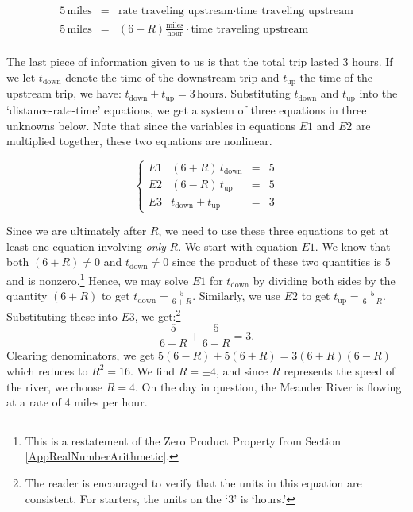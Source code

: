 \documentclass{ximera}
\begin{document}
\begin{example}
\begin{explanation}
\[\begin{array}{rcl}
5 \, \text{miles} & = & \text{rate traveling upstream} \cdot \text{time traveling upstream} \\ 

5 \, \text{miles} & = & (6 - R) \frac{\text{miles}}{\text{hour}} \cdot \text{time traveling upstream} \\ 	\end{array} \]
 
The last piece of information given to us is that the total trip lasted $3$ hours.  If we let $t_{\text{down}}$ denote the time of the downstream trip and $t_{\text{up}}$ the time of the upstream trip, we have:    $t_{\text{down}} + t_{\text{up}} = 3 \, \text{hours}$.  Substituting $t_{\text{down}}$ and $t_{\text{up}}$ into the `distance-rate-time' equations, we get a system of three equations in three unknowns below.  Note that since the variables in equations $E1$ and $E2$ are multiplied together, these two equations are nonlinear.

 \[\left\{\begin{array}{lrcl}   E1 & (6+R) \, t_{\text{down}} & = & 5 \\ E2 & (6-R) \, t_{\text{up}} & = & 5 \\ E3 & t_{\text{down}} + t_{\text{up}} & = & 3 \end{array} \right.\]

Since we are ultimately after $R$, we need to use these three equations to get at least one equation involving \textit{only} $R$.  We start with equation $E1$. We know that both $(6+R) \neq 0$  and  $t_{\text{down}} \neq 0$ since the product of these two quantities is $5$ and is nonzero.\footnote{This is a restatement of the Zero Product Property from Section \ref{AppRealNumberArithmetic}.}  Hence, we may solve $E1$ for $t_{\text{down}}$ by dividing both sides by the quantity $(6+R)$ to get $t_{\text{down}} = \frac{5}{6+R}$.   Similarly, we use $E2$  to get $t_{\text{up}} = \frac{5}{6-R}$. Substituting these into $E3$, we get:\footnote{The reader is encouraged to verify that the units in this equation are consistent. For starters, the units on the `3' is `hours.'} \[\frac{5}{6+R} + \frac{5}{6 - R} = 3.\] Clearing denominators, we get $5(6-R) + 5(6+R) = 3(6+R)(6-R)$ which reduces to  $R^2 = 16$.   We find $R = \pm 4$, and since $R$ represents the speed of the river, we choose $R = 4$.   On the day in question, the Meander River is flowing at a rate of $4$ miles per hour. 
\end{explanation}
\end{example}
\end{document}
